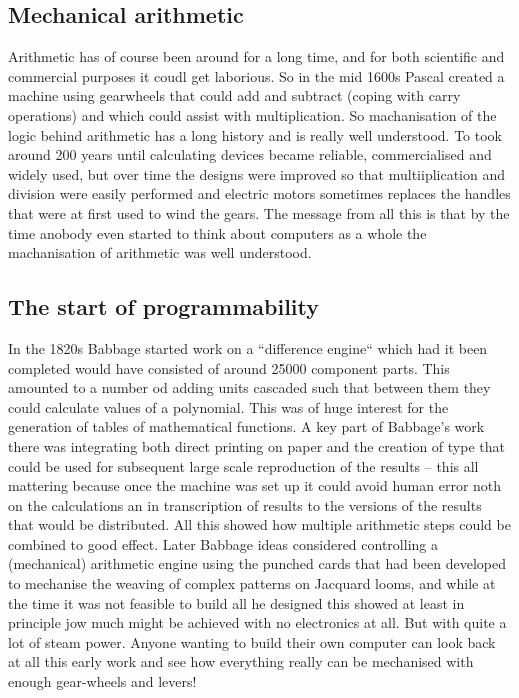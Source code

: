 \subsection{Mechanical arithmetic}
Arithmetic has of course been around for a long time, and for both scientific
and commercial purposes it coudl get laborious. So in the mid 1600s
Pascal\cite{pascaline} created a machine using gearwheels that could
add and subtract (coping with carry operations) and which could assist
with multiplication. So machanisation of the logic behind arithmetic has
a long history and is really well understood. To took around 200 years until
calculating devices became reliable, commercialised and widely used,
but over time the designs were improved so that multiiplication and division
were easily performed and electric motors sometimes replaces the handles
that were at first used to wind the gears. The message from all this is
that by the time anobody even started to think about computers as a whole
the machanisation of arithmetic was well understood.
\subsection{The start of programmability}
In the 1820s Babbage\cite{babbage} started work on a ``difference engine``
which had it been completed would have consisted of around 25000 component
parts. This amounted to a number od adding units cascaded such that between
them they could calculate values of a polynomial. This was of huge interest
for the generation of tables of mathematical functions. A key part of
Babbage's work there was integrating both direct printing on paper and
the creation of type that could be used for subsequent large scale
reproduction of the results -- this all mattering because once the machine
was set up it could avoid human error noth on the calculations an in
transcription of results to the versions of the results that would be
distributed. All this showed how multiple arithmetic steps could be
combined to good effect. Later Babbage ideas considered controlling
a (mechanical) arithmetic engine using the punched cards that had been
developed to mechanise the weaving of complex patterns on Jacquard looms,
and while at the time it was not feasible to build all he designed this
showed at least in principle jow much might be achieved with no electronics
at all. But with quite a lot of steam power. Anyone wanting to build
their own computer can look back at all this early work and see how
everything really can be mechanised with enough gear-wheels and levers!
